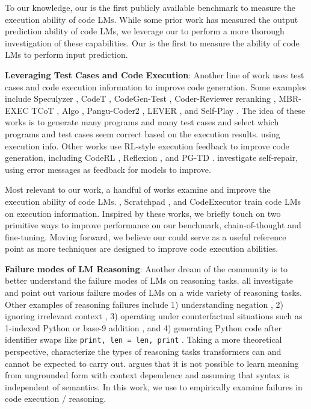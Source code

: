 To our knowledge, our \benchmark is the first publicly available benchmark to measure the execution ability of code LMs. While some prior work has measured the output prediction ability of code LMs, we leverage our \benchmarko to perform a more thorough investigation of these capabilities. Our \benchmarki is the first to measure the ability of code LMs to perform input prediction.

\textbf{Leveraging Test Cases and Code Execution}: Another line of work uses test cases and code execution information to improve code generation. Some examples include Speculyzer \citep{key2022speak}, CodeT \citep{chen2022codet}, CodeGen-Test \citep{zhong2022codegen}, Coder-Reviewer reranking \citep{zhang2023coder}, MBR-EXEC \citep{shi2022natural}
TCoT \citep{tian2023test},
Algo \citep{zhang2023algo}, Pangu-Coder2 \citep{shen2023pangu}, LEVER \cite{ni2023lever}, and Self-Play \citep{haluptzok2022language}.
The idea of these works is to generate many programs and many test cases and select which programs and test cases seem correct based on the execution results. 
using execution info. Other works use RL-style execution feedback to improve code generation, including CodeRL \citep{le2022coderl}, Reflexion \citep{shinn2023reflexion}, and PG-TD \citep{zhang2023planning}. \citep{chen2023teaching, olausson2023demystifying, madaan2023self, peng2023check, zhang2023self} investigate self-repair, using error messages as feedback for models to improve.

Most relevant to our work, a handful of works examine and improve the execution ability of code LMs. \cite{austin2021program}, 
Scratchpad \citep{nye2021show}, and CodeExecutor \citep{liu2023code} train code LMs on execution information. Inspired by these works, we briefly touch on two primitive ways to improve performance on our benchmark, chain-of-thought and fine-tuning. Moving forward, we believe our \benchmark could serve as a useful reference point as more techniques are designed to improve code execution abilities.

\textbf{Failure modes of LM Reasoning}: Another dream of the community is to better understand the failure modes of LMs on reasoning tasks. \cite{bubeck2023sparks, liu2023evaluating, arkoudas2023gpt, zhang2022paradox, dziri2023faith, olausson2023linc, lee2023teaching, zhang2023can} all investigate and point out various failure modes of LMs on a wide variety of reasoning tasks. Other examples of reasoning failures include 1) understanding negation \citep{hosseini2021understanding}, 2) ignoring irrelevant context \citep{shi2023large}, 3) operating under counterfactual situations such as 1-indexed Python or base-9 addition \citep{wu2023reasoning}, and 4) generating Python code after identifier swaps like \texttt{print, len = len, print} \citep{miceli2023larger}. Taking a more theoretical perspective, \cite{dziri2023faith, zhou2023algorithms, merrill2023expresssive, giannou2023looped} characterize the types of reasoning tasks transformers can and cannot be expected to carry out.
\cite{merrill2021provable} argues that it is not possible to learn meaning from ungrounded form with context dependence and assuming that syntax is independent of semantics. 
In this work, we use \benchmark to empirically examine failures in code execution / reasoning. 

